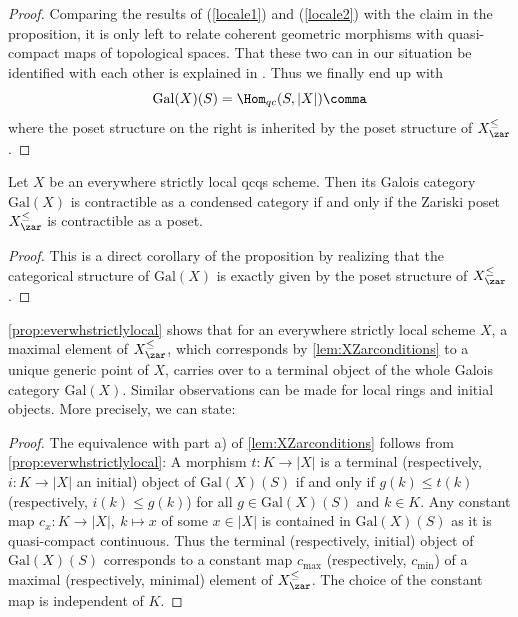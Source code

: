 \documentclass[leqno]{article}
\renewcommand{\Gal}{\mathrm{Gal}}
\newcommand{\Zpos}[1]{{#1}_{\zar}^{\leq}}
\begin{document}
\begin{proof}
Comparing the results of (\ref{locale1}) and (\ref{locale2}) with the claim in the proposition, it is only left to relate coherent geometric morphisms with quasi-compact maps of topological spaces.
That these two can in our situation be identified with each other is explained in \cite[Example 2.18]{Haine:1-localic}. Thus we finally end up with 
$$\Gal(X)(S)=\Hom_{qc}(S,|X|)\comma$$
where the poset structure on the right is inherited by the poset structure of $ \Zpos{X}$.
\end{proof}
\begin{corollary}
Let $X$ be an everywhere strictly local qcqs scheme.
Then its Galois category $\Gal(X)$ is contractible as a condensed category if and only if the  Zariski poset $\Zpos{X}$ is contractible as a poset.
\end{corollary}
\begin{proof}
This is a direct corollary of the proposition by realizing that the categorical structure of $\Gal(X)$ is exactly given by the poset structure of $ \Zpos{X}$.
\end{proof}
\cref{prop:everwhstrictlylocal} shows that for an everywhere strictly local scheme $X$, a maximal element of $ \Zpos{X}$, which corresponds by \cref{lem:XZarconditions} to a unique generic point of $X$, carries over to a terminal object of the whole Galois category $\Gal(X)$.
Similar observations can be made for local rings and initial objects. More precisely, we can state: 
\begin{proof}
The equivalence with part a) of \cref{lem:XZarconditions} follows from  \cref{prop:everwhstrictlylocal}:
A morphism $t\colon K\rightarrow |X|$ is a terminal (respectively, $i\colon K\rightarrow |X|$ an initial) object of $\Gal(X)(S)$ if and only if $g(k)\leq t(k)$ (respectively, $i(k)\leq g(k)$) for all $g\in \Gal(X)(S)$ and $k\in K$.
Any constant map $c_{x}\colon K \rightarrow |X|, \ k\mapsto x$ of some $x\in |X|$ is contained in $\Gal(X)(S)$ as it is quasi-compact continuous.
Thus the terminal (respectively, initial) object of $\Gal(X)(S)$ corresponds to a constant map $c_{\mathrm{max}}$ (respectively, $c_{\mathrm{min}}$) of a maximal (respectively, minimal) element of $ \Zpos{X}$.
The choice of the constant map is independent of $K$.
\end{proof}
\end{document}
